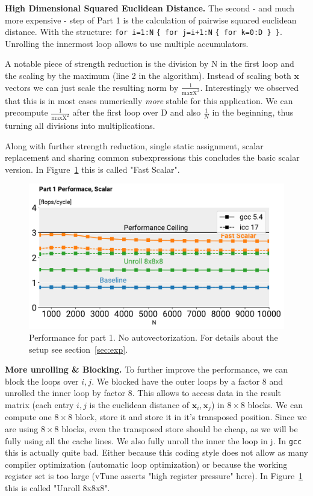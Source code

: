 \documentclass[letterpaper]{article}
\newcommand{\mypar}[1]{{\bf #1.}}
\begin{document}
\mypar{High Dimensional Squared Euclidean Distance}
The second - and much more expensive - step of Part 1 is the calculation of pairwise squared euclidean distance. With the structure: \texttt{for i=1:N} \texttt{\{ for j=i+1:N} \texttt{\{ for k=0:D \} \}}.
Unrolling the innermost loop allows to use multiple accumulators.

A notable piece of strength reduction is the division by N in the first loop and the scaling by the maximum (line 2 in the algorithm). Instead of scaling both $\mathbf{x}$ vectors we can just scale the resulting norm by $\frac{1}{\text{maxX}^2}$. Interestingly we observed that this is in most cases numerically \textit{more} stable for this application. We can precompute $\frac{1}{\text{maxX}^2}$ after the first loop over D and also $\frac{1}{N}$ in the beginning, thus turning all divisions into multiplications.

Along with further strength reduction, single static assignment, scalar replacement and sharing common subexpressions this concludes the basic scalar version. In Figure~\ref{fig:part1:novec} this is called "Fast Scalar".

\begin{figure}[h]
  \includegraphics[width=\linewidth]{images/part1_novec}
  \caption{Performance for part 1. No autovectorization. For details about the setup see section~\ref{sec:exp}.}
   \label{fig:part1:novec}
   \vspace{-5mm}
\end{figure}

\mypar{More unrolling \& Blocking}
To further improve the performance, we can block the loops over $i,j$. We blocked have the outer loops by a factor 8 and unrolled the inner loop by factor 8. This allows to access data in the result matrix (each entry $i,j$ is the euclidean distance of $\mathbf{x}_i, \mathbf{x}_j$) in $8 \times 8$ blocks. We can compute one $8\times 8$ block, store it and store it in it's transposed position. Since we are using $8 \times 8$ blocks, even the transposed store should be cheap, as we will be fully using all the cache lines. We also fully unroll the inner the loop in j.
In \texttt{gcc} this is actually quite bad. Either because this coding style does not allow as many compiler optimization (automatic loop optimization) or because  the working register set is too large (vTune asserts "high register pressure" here). In Figure~\ref{fig:part1:novec} this is called "Unroll 8x8x8".
\end{document}
